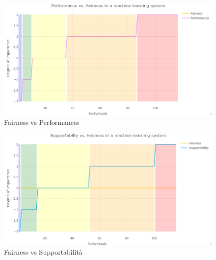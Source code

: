     \begin{figure}[h!]
        \centering
        \includegraphics[width=1\textwidth]{figure/Analisi/RQ3/3.Performance vs. Fairness.png}
        \caption{Fairness vs Performances}
    \end{figure}
    
    
    \begin{figure}[h!]
        \centering
        \includegraphics[width=1\textwidth]{figure/Analisi/RQ3/4.Supportablity vs. Fairness.png}
        \caption{Fairness vs Supportabilità}
    \end{figure}
    
